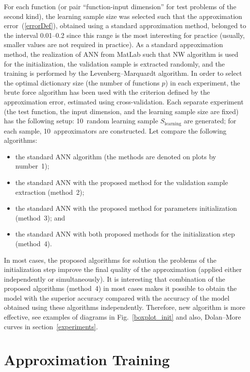 \begin{multicols}{2}
For each function (or pair ``function-input dimension'' for test problems of 
the second kind),  the learning sample size was selected such that the approximation error~(\ref{errorDef}), 
obtained using a standard approximation method, belonged to the interval
0.01--0.2 since this range is the most interesting for practice (usually, smaller 
values are not required in practice).
As a standard approximation method, the realization of ANN from MatLab such that
NW algorithm is used for the initialization, the validation sample is extracted 
randomly, and the training is performed by the Levenberg--Marquardt algorithm. In order to select 
the optimal dictionary size (the number of functions $p$) in each experiment, the brute 
force algorithm has been used with the criterion defined by the approximation error, estimated using 
cross-validation. Each separate experiment (the test function, the input dimension, and the
learning sample size are fixed) has the following setup:
10~random learning sample $S_{\mathrm{learning}}$ are generated; for each sample,
10~approximators are constructed. Let compare the following algorithms:
\begin{itemize}
\item the standard ANN algorithm (the methods are denoted on plots by number~1); 
\item the standard ANN with the proposed method for the validation sample extraction
(method~2); 
\item the standard ANN with the proposed
method for parameters initialization (method~3); and 
\item the standard ANN with both proposed
methods for the initialization step (method~4).
\end{itemize}


In most cases, the proposed algorithms for solution the problems of the initialization 
step improve the final quality of the approximation (applied either independently or simultaneously). 
It is interesting that combination of the proposed algorithms (method~4) 
in most cases makes it possible to obtain the model with the superior accuracy 
compared with the accuracy of the model obtained using these algorithms independently.
Therefore, new algorithm is more effective, see examples of diagrams 
in Fig.~\ref{boxplot_init} and also, Dolan--More curves in section~\ref{experiments}.

\section{Approximation Training}
\label{stage2}
 

\end{multicols}
